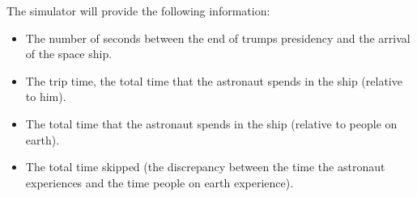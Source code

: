 		The simulator will provide the following information:
		\begin{itemize}
			\item The number of seconds between the end of trumps presidency and the arrival of the space ship.
			\item The trip time, the total time that the astronaut spends in the ship (relative to him).
			\item The total time that the astronaut spends in the ship (relative to people on earth).
			\item The total time skipped (the discrepancy between the time the astronaut experiences and the time people on earth experience).
		\end{itemize}
